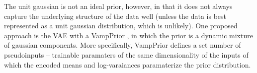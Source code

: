 \documentclass[./dissertation.tex]{subfiles}
\begin{document}
    The unit gaussian is not an ideal prior, however, in that it does not always capture the underlying structure of the data well (unless the data is best represented as a unit gaussian distribution, which is unlikely). One proposed approach is the VAE with a VampPrior \cite{DBLP:journals/corr/TomczakW17}, in which the prior is a dynamic mixture of gaussian components. More specifically, VampPrior defines a set number of pseudoinputs -- trainable paramaters of the same dimensionality of the inputs of which the encoded means and log-varaiances paramaterize the prior distribution. 

    
\end{document}
